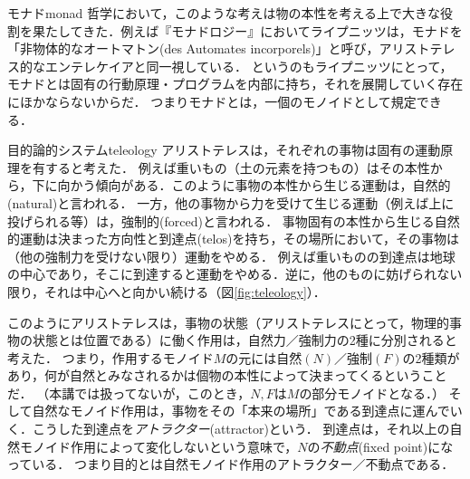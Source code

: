 \documentclass[11pt,a4paper, dvipdfmx]{jsarticle}
\begin{document}
\begin{rei}{モナド}{monad}
    哲学において，このような考えは物の本性を考える上で大きな役割を果たしてきた．例えば『モナドロジー』においてライプニッツは，モナドを「非物体的なオートマトン(des Automates incorporels)」と呼び，アリストテレス的なエンテレケイアと同一視している．
    というのもライプニッツにとって，モナドとは固有の行動原理・プログラムを内部に持ち，それを展開していく存在にほかならないからだ．
    つまりモナドとは，一個のモノイドとして規定できる．
\end{rei} 


\begin{rei}{目的論的システム}{teleology}
    アリストテレスは，それぞれの事物は固有の運動原理を有すると考えた．
    例えば重いもの（土の元素を持つもの）はその本性から，下に向かう傾向がある．このように事物の本性から生じる運動は，自然的(natural)と言われる．
    一方，他の事物から力を受けて生じる運動（例えば上に投げられる等）は，強制的(forced)と言われる．
    事物固有の本性から生じる自然的運動は決まった方向性と到達点(telos)を持ち，その場所において，その事物は（他の強制力を受けない限り）運動をやめる．
    例えば重いものの到達点は地球の中心であり，そこに到達すると運動をやめる．逆に，他のものに妨げられない限り，それは中心へと向かい続ける（図\ref{fig:teleology}）．
    
    このようにアリストテレスは，事物の状態（アリストテレスにとって，物理的事物の状態とは位置である）に働く作用は，自然力／強制力の2種に分別されると考えた．
    つまり，作用するモノイド$M$の元には自然$(N)$／強制$(F)$の2種類があり，何が自然とみなされるかは個物の本性によって決まってくるということだ．
    （本講では扱ってないが，このとき，$N, F$は$M$の部分モノイドとなる．）
    そして自然なモノイド作用は，事物をその「本来の場所」である到達点に運んでいく．こうした到達点を\emph{アトラクター}(attractor)という．
    到達点は，それ以上の自然モノイド作用によって変化しないという意味で，$N$の\emph{不動点}(fixed point)になっている．
    つまり目的とは自然モノイド作用のアトラクター／不動点である．    
\end{rei}
\end{document}
